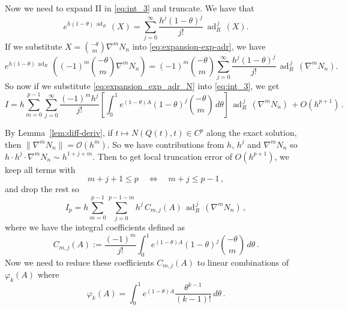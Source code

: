 \documentclass[12pt]{article}
\DeclareMathOperator{\ad}{ad}
\begin{document}
Now we need to expand II in \eqref{eq:int_3} and truncate. We have that
\begin{equation}
\label{eq:expansion-exp-adr}
    e^{h(1-\theta)\,\ad_R}\, (X) = \sum_{j=0}^{\infty} \frac{h^j(1-\theta)^j}{j!}\,\ad_R^{\,j}\,(X).
\end{equation}
If we substitute $X = \binom{-\theta}{m}\nabla^mN_n$ into \eqref{eq:expansion-exp-adr}, we have
\begin{equation}
\label{eq:expansion_exp_adr_N}
    e^{h(1-\theta)\,\ad_R}\, \left((-1)^m\binom{-\theta}{m}\nabla^mN_n \right) = (-1)^m\binom{-\theta}{m}\sum_{j=0}^{\infty} \frac{h^j(1-\theta)^j}{j!}\,\ad_R^{\,j}\,\left(\nabla^mN_n \right).
\end{equation}
So now if we substitute \eqref{eq:expansion_exp_adr_N} into \eqref{eq:int_3}, we get
\begin{equation}
    \textit{I} = h\sum_{m=0}^{p-1}\sum_{j=0}^{\infty}\frac{(-1)^mh^j}{j!}\left[\int_0^1 e^{(1-\theta)A}(1-\theta)^j\binom{-\theta}{m}\,d\theta\right]\,\ad_R^{\,j}\,\left(\nabla^mN_n \right)\, + O(h^{p+1})\,.
\end{equation}

By Lemma~\ref{lem:diff-deriv}, if
$t\mapsto N(Q(t),t)\in C^{p}$ along the exact solution, then
$\|\nabla^m N_n\|=\mathcal{O}(h^m)$. 
So we have contributions from $h$, $h^j$ and $\nabla^mN_n$ so $h \cdot h^j \cdot \nabla^mN_n \sim h^{1+j+m}$. Then to get local truncation error of $O(h^{p+1})$, we keep all terms with
\begin{equation}
    m+j+1 \leq p \quad \Leftrightarrow \quad m+j \leq p-1 \,,
\end{equation}
and drop the rest so 
\begin{equation}
\label{eq:I_p}
    \textit{I}_p = h\sum_{m=0}^{p-1}\sum_{j=0}^{p-1-m}h^j\,C_{m,j}(A)\,\ad_R^{\,j}\,\left(\nabla^mN_n \right)\,,
\end{equation}
where we have the integral coefficients defined as
\begin{equation}
\label{eq:c_mj}
    C_{m,j}(A):=\frac{(-1)^m}{j!}\int_0^1 e^{(1-\theta)A}(1-\theta)^j\binom{-\theta}{m}\,d\theta\,.
\end{equation}
Now we need to reduce these coefficients $C_{m,j}(A)$ to linear combinations of $\varphi_k(A)$ where
\begin{equation}
    \varphi_k(A) = \int_0^{1} e^{(1 - \theta)A} \frac{\theta^{k-1}}{(k-1)!}\, d\theta\,.
\end{equation}
\end{document}
